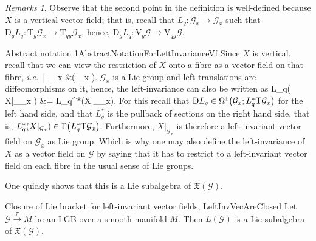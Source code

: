 \documentclass[a4paper,oneside,11pt,bibliography=totoc]{scrartcl}
\def\ba#1\ea{\begin{align}#1\end{align}}
\def\bas#1\eas{\begin{align*}#1\end{align*}}
\theoremstyle{plain}
\theoremstyle{remark}
\newtheorem{remark}[theorem]{Remarks}
\theoremstyle{definition}
\begin{document}
\begin{remark}
\leavevmode\newline
Observe that the second point in the definition is well-defined because $X$ is a vertical vector field; that is, recall that $L_q: \mathcal{G}_x \to \mathcal{G}_x$ such that $\mathrm{D}_gL_q: \mathrm{T}_g\mathcal{G}_x \to \mathrm{T}_{qg}\mathcal{G}_x$, hence, $\mathrm{D}_gL_q: \mathrm{V}_g\mathcal{G} \to \mathrm{V}_{qg}\mathcal{G}$.
\end{remark}

\begin{remarks}{Abstract notation 1}{AbstractNotationForLeftInvarianceVf}
Since $X$ is vertical, recall that we can view the restriction of $X$ onto a fibre as a vector field on that fibre, \textit{i.e.}\
\bas
X|_{_x} &\in {}\mleft( _x \mright).
\eas
$\mathcal{G}_x$ is a Lie group and left translations are diffeomorphisms on it, hence, the left-invariance can also be written as
\ba
\mathrm{D}L_q\mleft( X|_{_x} \mright) &= L_q^*\mleft(X|_{_x}\mright).
\ea
For this recall that $\mathrm{D}L_q \in \Omega^1\mleft(\mathcal{G}_x; L_q^*\mathrm{T}\mathcal{G}_x\mright)$ for the left hand side, and that $L_q^*$ is the pullback of sections on the right hand side, that is, $L_q^*\mleft(X|_{\mathcal{G}_x}\mright) \in \Gamma\mleft(L_q^*\mathrm{T}\mathcal{G}_x\mright)$.
Furthermore, $X|_{\mathcal{G}_x}$ is therefore a left-invariant vector field on $\mathcal{G}_x$ as Lie group. Which is why one may also define the left-invariance of $X$ as a vector field on $\mathcal{G}$ by saying that it has to restrict to a left-invariant vector field on each fibre in the usual sense of Lie groups.
\end{remarks}

One quickly shows that this is a Lie subalgebra of $\mathfrak{X}(\mathcal{G})$.

\begin{lemmata}{Closure of Lie bracket for left-invariant vector fields, \newline \cite[\S 3.5, special situation of Lemma 3.5.5, page 122]{mackenzieGeneralTheory}}{LeftInvVecAreClosed}
Let $\mathcal{G} \stackrel{\pi}{\to} M$ be an LGB over a smooth manifold $M$. Then $L(\mathcal{G})$ is a Lie subalgebra of $\mathfrak{X}(\mathcal{G})$.
\end{lemmata}
\end{document}
